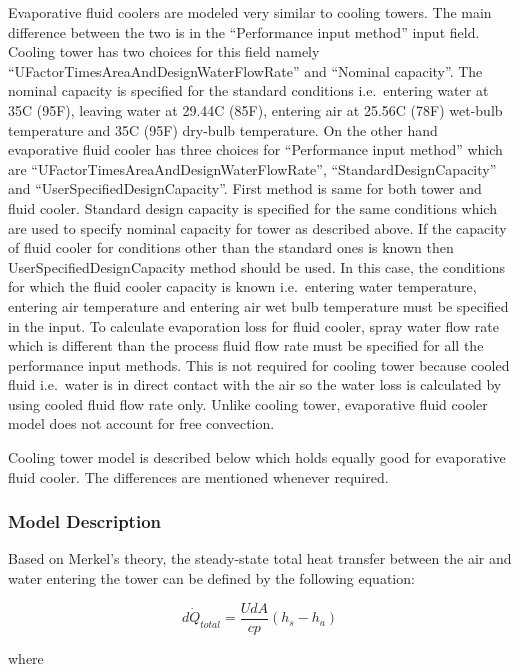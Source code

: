 Evaporative fluid coolers are modeled very similar to cooling towers. The main difference between the two is in the ``Performance input method'' input field. Cooling tower has two choices for this field namely ``UFactorTimesAreaAndDesignWaterFlowRate'' and ``Nominal capacity''. The nominal capacity is specified for the standard conditions i.e.~entering water at 35C (95F), leaving water at 29.44C (85F), entering air at 25.56C (78F) wet-bulb temperature and 35C (95F) dry-bulb temperature. On the other hand evaporative fluid cooler has three choices for ``Performance input method'' which are ``UFactorTimesAreaAndDesignWaterFlowRate'', ``StandardDesignCapacity'' and ``UserSpecifiedDesignCapacity''. First method is same for both tower and fluid cooler. Standard design capacity is specified for the same conditions which are used to specify nominal capacity for tower as described above. If the capacity of fluid cooler for conditions other than the standard ones is known then UserSpecifiedDesignCapacity method should be used. In this case, the conditions for which the fluid cooler capacity is known i.e.~entering water temperature, entering air temperature and entering air wet bulb temperature must be specified in the input. To calculate evaporation loss for fluid cooler, spray water flow rate which is different than the process fluid flow rate must be specified for all the performance input methods. This is not required for cooling tower because cooled fluid i.e.~water is in direct contact with the air so the water loss is calculated by using cooled fluid flow rate only. Unlike cooling tower, evaporative fluid cooler model does not account for free convection.

Cooling tower model is described below which holds equally good for evaporative fluid cooler. The differences are mentioned whenever required.

\subsubsection{Model Description}\label{model-description-008}

Based on Merkel's theory, the steady-state total heat transfer between the air and water entering the tower can be defined by the following equation:

\begin{equation}
d{\dot Q_{total}} = \frac{{UdA}}{{cp}}\left( {{h_s} - {h_a}} \right)
\end{equation}

where

